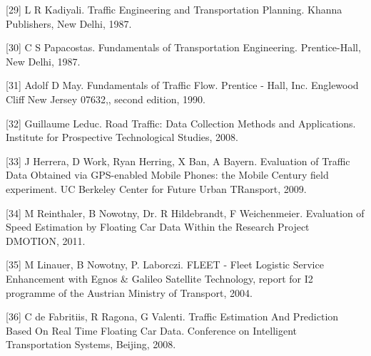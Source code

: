 \documentclass[final,fmstyle]{fpunathesis}
\begin{document}
[29] L R Kadiyali. Traffic Engineering and Transportation Planning. Khanna Publishers, New Delhi, 1987.

[30] C S Papacostas. Fundamentals of Transportation Engineering. Prentice-Hall, New Delhi, 1987.

[31] Adolf D May. Fundamentals of Traffic Flow. Prentice - Hall, Inc. Englewood Cliff New Jersey 07632,, second edition, 1990.

[32] Guillaume Leduc. Road Traffic: Data Collection Methods and Applications. Institute for Prospective Technological Studies, 2008.

[33] J Herrera, D Work, Ryan Herring, X Ban, A Bayern. Evaluation of Traffic Data Obtained via GPS-enabled Mobile Phones: the Mobile Century field experiment. UC Berkeley Center for Future Urban TRansport, 2009.

[34] M Reinthaler, B Nowotny, Dr. R Hildebrandt, F Weichenmeier. Evaluation of Speed Estimation by Floating Car Data Within the Research Project DMOTION, 2011.

[35] M Linauer, B Nowotny, P. Laborczi. FLEET - Fleet Logistic Service Enhancement with Egnos \& Galileo Satellite Technology, report for I2 programme of the Austrian Ministry of Transport, 2004.

[36] C de Fabritiis, R Ragona, G Valenti. Traffic Estimation And Prediction Based On Real Time Floating Car Data. Conference on Intelligent Transportation Systems, Beijing, 2008.
\end{document}

